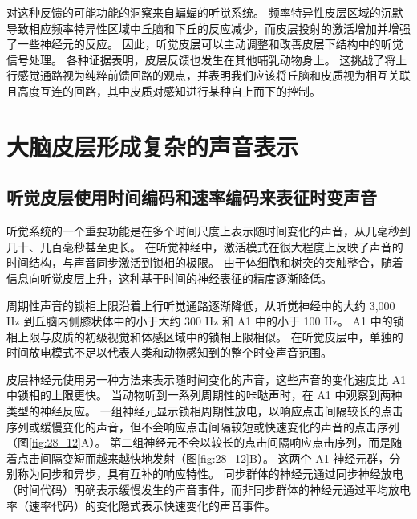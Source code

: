 对这种反馈的可能功能的洞察来自蝙蝠的听觉系统。 
频率特异性皮层区域的沉默导致相应频率特异性区域中丘脑和下丘的反应减少，而皮层投射的激活增加并增强了一些神经元的反应。
因此，听觉皮层可以主动调整和改善皮层下结构中的听觉信号处理。 
各种证据表明，皮层反馈也发生在其他哺乳动物身上。 
这挑战了将上行感觉通路视为纯粹前馈回路的观点，并表明我们应该将丘脑和皮质视为相互关联且高度互连的回路，其中皮质对感知进行某种自上而下的控制。


\section{大脑皮层形成复杂的声音表示}


\subsection{听觉皮层使用时间编码和速率编码来表征时变声音}
听觉系统的一个重要功能是在多个时间尺度上表示随时间变化的声音，从几毫秒到几十、几百毫秒甚至更长。 
在听觉神经中，激活模式在很大程度上反映了声音的时间结构，与声音同步激活到锁相的极限。 
由于体细胞和树突的突触整合，随着信息向听觉皮层上升，这种基于时间的神经表征的精度逐渐降低。


周期性声音的锁相上限沿着上行听觉通路逐渐降低，从听觉神经中的大约 3,000 Hz 到丘脑内侧膝状体中的小于大约 300 Hz 和 A1 中的小于 100 Hz。 
A1 中的锁相上限与皮质的初级视觉和体感区域中的锁相上限相似。 
在听觉皮层中，单独的时间放电模式不足以代表人类和动物感知到的整个时变声音范围。


皮层神经元使用另一种方法来表示随时间变化的声音，这些声音的变化速度比 A1 中锁相的上限更快。 
当动物听到一系列周期性的咔哒声时，在 A1 中观察到两种类型的神经反应。 
一组神经元显示锁相周期性放电，以响应点击间隔较长的点击序列或缓慢变化的声音，但不会响应点击间隔较短或快速变化的声音的点击序列（图\ref{fig:28_12}A）。 
第二组神经元不会以较长的点击间隔响应点击序列，而是随着点击间隔变短而越来越快地发射（图\ref{fig:28_12}B）。 
这两个 A1 神经元群，分别称为同步和异步，具有互补的响应特性。 
同步群体的神经元通过同步神经放电（时间代码）明确表示缓慢发生的声音事件，而非同步群体的神经元通过平均放电率（速率代码）的变化隐式表示快速变化的声音事件。

